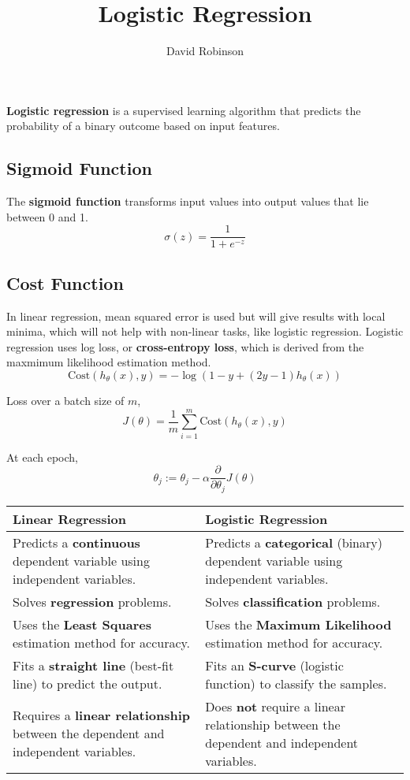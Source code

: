 \documentclass{article}
\title{Logistic Regression}
\author{David Robinson}
\date{}
\begin{document}
\maketitle

\textbf{Logistic regression} is a supervised learning algorithm that predicts the probability of a binary outcome based on input features.

\subsection*{Sigmoid Function}

The \textbf{sigmoid function} transforms input values into output values that lie between 0 and 1.
\[\sigma(z)=\frac{1}{1+e^{-z}}\]

\subsection*{Cost Function}

In linear regression, mean squared error is used but will give results with local minima, which will not help with non-linear tasks, like logistic regression. Logistic regression uses log loss, or \textbf{cross-entropy loss}, which is derived from the maxmimum likelihood estimation method.
\[\text{Cost}(h_\theta(x),y)=-\log(1-y+(2y-1)h_\theta(x))\]

Loss over a batch size of $m$,
\[J(\theta)=\frac{1}{m}\sum_{i=1}^m \text{Cost}(h_\theta(x),y)\]

At each epoch,
\[\theta_j := \theta_j-\alpha\frac{\partial}{\partial\theta_j}J(\theta)\]
\vspace{1em}
\begin{center}
    \renewcommand{\arraystretch}{1.5}
    \begin{tabularx}{\textwidth}{|X|X|}
        \hline
        \textbf{Linear Regression} & \textbf{Logistic Regression} \\
        \hline
        Predicts a \textbf{continuous} dependent variable using independent variables. & Predicts a \textbf{categorical} (binary) dependent variable using independent variables. \\
        \hline
        Solves \textbf{regression} problems. & Solves \textbf{classification} problems. \\
        \hline
        Uses the \textbf{Least Squares} estimation method for accuracy. & Uses the \textbf{Maximum Likelihood} estimation method for accuracy. \\
        \hline
        Fits a \textbf{straight line} (best-fit line) to predict the output. & Fits an \textbf{S-curve} (logistic function) to classify the samples. \\
        \hline
        Requires a \textbf{linear relationship} between the dependent and independent variables. & Does \textbf{not} require a linear relationship between the dependent and independent variables. \\
        \hline
    \end{tabularx}
\end{center}
\end{document}
